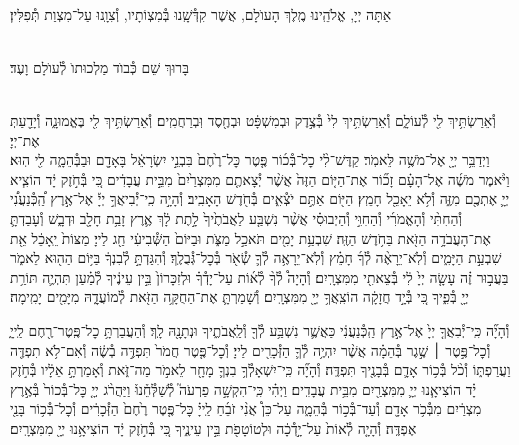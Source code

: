\documentclass[twoside, openany, parskip=half, 11pt]{book}
\begin{document}
\\
אַתָּה יְיָ, אֱלֹהֵֽינוּ מֶֽלֶךְ הָעוֺלָם, אֲשֶׁר קִדְּ֯שָֽׁנוּ בְּ֯מִצְוֹתָיו, וְ֯צִוָֽנוּ עַל־מִצְוַת תְּ֯פִלִּין׃

\\
בָּרוּךְ שֵׁם כְּ֯בוֺד מַלְכוּתוֺ לְ֯עוֺלָם וָעֶד׃


\\
וְ֯אֵרַשְׂתִּ֥יךְ לִ֖י לְ֯עוֹלָ֑ם וְ֯אֵרַשְׂתִּ֥יךְ לִי֙ בְּ֯צֶ֣דֶק וּבְמִשְׁפָּ֔ט וּבְחֶ֖סֶד וּֽבְרַחֲמִֽים׃ וְ֯אֵרַשְׂתִּ֥יךְ לִ֖י בֶּאֱמוּנָ֑ה וְ֯יָדַ֖עַתְּ אֶת־יְיָ׃\\
וַיְדַבֵּ֥ר יְיָ֖ אֶל־מֹשֶׁ֥ה לֵּאמֹֽר׃ קַדֶּשׁ־לִ֨י כׇל־בְּ֯כ֜וֹר פֶּ֤טֶר כׇּל־רֶ֙חֶם֙ בִּבְנֵ֣י יִשְׂרָאֵ֔ל בָּאָדָ֖ם וּבַבְּ֯הֵמָ֑ה לִ֖י הֽוּא׃ וַיֹּ֨אמֶר מֹשֶׁ֜ה אֶל־הָעָ֗ם זָכ֞וֹר אֶת־הַיּ֤וֹם הַזֶּה֙ אֲשֶׁ֨ר יְ֯צָאתֶ֤ם מִמִּצְרַ֙יִם֙ מִבֵּ֣ית עֲבָדִ֔ים כִּ֚י בְּ֯חֹ֣זֶק יָ֔ד הוֹצִ֧יא יְיָ֛ אֶתְכֶ֖ם מִזֶּ֑ה וְ֯לֹ֥א יֵאָכֵ֖ל חָמֵֽץ׃ הַיּ֖וֹם אַתֶּ֣ם יֹצְ֯אִ֑ים בְּ֯חֹ֖דֶשׁ הָאָבִֽיב׃ וְ֯הָיָ֣ה כִֽי־יְ֯בִיאֲךָ֣ יְיָ֡ אֶל־אֶ֣רֶץ הַֽ֠כְּ֯נַעֲנִ֠י וְ֯הַחִתִּ֨י וְ֯הָאֱמֹרִ֜י וְ֯הַחִוִּ֣י וְ֯הַיְבוּסִ֗י אֲשֶׁ֨ר נִשְׁבַּ֤ע לַאֲבֹתֶ֙יךָ֙ לָ֣תֶת לָ֔ךְ אֶ֛רֶץ זָבַ֥ת חָלָ֖ב וּדְבָ֑שׁ וְ֯עָבַדְתָּ֛ אֶת־הָעֲבֹדָ֥ה הַזֹּ֖את בַּחֹ֥דֶשׁ הַזֶּֽה׃ שִׁבְעַ֥ת יָמִ֖ים תֹּאכַ֣ל מַצֹּ֑ת וּבַיּוֹם֙ הַשְּׁ֯בִיעִ֔י חַ֖ג לַייָ׃ מַצּוֹת֙ יֵֽאָכֵ֔ל אֵ֖ת שִׁבְעַ֣ת הַיָּמִ֑ים וְ֯לֹֽא־יֵרָאֶ֨ה לְ֯ךָ֜ חָמֵ֗ץ וְ֯לֹֽא־יֵרָאֶ֥ה לְ֯ךָ֛ שְׂ֯אֹ֖ר בְּ֯כׇל־גְּ֯בֻלֶֽךָ׃ וְ֯הִגַּדְתָּ֣ לְ֯בִנְךָ֔ בַּיּ֥וֹם הַה֖וּא לֵאמֹ֑ר בַּעֲב֣וּר זֶ֗ה עָשָׂ֤ה יְיָ֙ לִ֔י בְּ֯צֵאתִ֖י מִמִּצְרָֽיִם׃ וְ֯הָיָה֩ לְ֯ךָ֨ לְ֯א֜וֹת עַל־יָדְ֯ךָ֗ וּלְזִכָּרוֹן֙ בֵּ֣ין עֵינֶ֔יךָ לְ֯מַ֗עַן תִּהְיֶ֛ה תּוֹרַ֥ת יְיָ֖ בְּ֯פִ֑יךָ כִּ֚י בְּ֯יָ֣ד חֲזָקָ֔ה הוֹצִֽאֲךָ֥ יְיָ֖ מִמִּצְרָֽיִם׃ וְ֯שָׁמַרְתָּ֛ אֶת־הַחֻקָּ֥ה הַזֹּ֖את לְ֯מוֹעֲדׇ֑הּ מִיָּמִ֖ים יָמִֽימָה׃

וְ֯הָיָ֞ה כִּֽי־יְ֯בִאֲךָ֤ יְיָ֙ אֶל־אֶ֣רֶץ הַֽכְּ֯נַעֲנִ֔י כַּאֲשֶׁ֛ר נִשְׁבַּ֥ע לְ֯ךָ֖ וְ֯לַֽאֲבֹתֶ֑יךָ וּנְתָנׇ֖הּ לָֽךְ׃ וְ֯הַעֲבַרְתָּ֥ כׇל־פֶּֽטֶר־רֶ֖חֶם לַֽייָ֑ וְ֯כׇל־פֶּ֣טֶר ׀ שֶׁ֣גֶר בְּ֯הֵמָ֗ה אֲשֶׁ֨ר יִהְיֶ֥ה לְ֯ךָ֛ הַזְּ֯כָרִ֖ים לַייָ׃ וְ֯כׇל־פֶּ֤טֶר חֲמֹר֙ תִּפְדֶּ֣ה בְ֯שֶׂ֔ה וְ֯אִם־לֹ֥א תִפְדֶּ֖ה וַעֲרַפְתּ֑וֹ וְ֯כֹ֨ל בְּ֯כ֥וֹר אָדָ֛ם בְּ֯בָנֶ֖יךָ תִּפְדֶּֽה׃ וְ֯הָיָ֞ה כִּֽי־יִשְׁאָלְ֯ךָ֥ בִנְךָ֛ מָחָ֖ר לֵאמֹ֣ר מַה־זֹּ֑את וְ֯אָמַרְתָּ֣ אֵלָ֔יו בְּ֯חֹ֣זֶק יָ֗ד הוֹצִיאָ֧נוּ יְיָ֛ מִמִּצְרַ֖יִם מִבֵּ֥ית עֲבָדִֽים׃ וַיְהִ֗י כִּֽי־הִקְשָׁ֣ה פַרְעֹה֮ לְ֯שַׁלְּ֯חֵ֒נוּ֒ וַיַּהֲרֹ֨ג יְיָ֤ כׇּל־בְּ֯כוֹר֙ בְּ֯אֶ֣רֶץ מִצְרַ֔יִם מִבְּ֯כֹ֥ר אָדָ֖ם וְ֯עַד־בְּ֯כ֣וֹר בְּ֯הֵמָ֑ה עַל־כֵּן֩ אֲנִ֨י זֹבֵ֜חַ לַֽייָ֗ כׇּל־פֶּ֤טֶר רֶ֙חֶם֙ הַזְּ֯כָרִ֔ים וְ֯כׇל־בְּ֯כ֥וֹר בָּנַ֖י אֶפְדֶּֽה׃ וְ֯הָיָ֤ה לְ֯אוֹת֙ עַל־יָ֣דְ֯כָ֔ה וּלְטוֹטָפֹ֖ת בֵּ֣ין עֵינֶ֑יךָ כִּ֚י בְּ֯חֹ֣זֶק יָ֔ד הוֹצִיאָ֥נוּ יְיָ֖ מִמִּצְרָֽיִם׃
\end{document}
